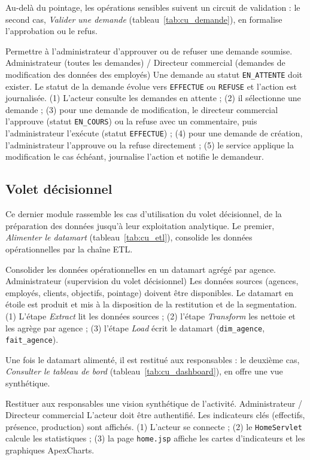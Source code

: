 Au-delà du pointage, les opérations sensibles suivent un circuit de validation : le
second cas, \emph{Valider une demande} (tableau~\ref{tab:cu_demande}), en formalise
l'approbation ou le refus.

{Permettre à l'administrateur d'approuver ou de refuser une demande soumise.}
{Administrateur (toutes les demandes) / Directeur commercial (demandes de
modification des données des employés)}
{Une demande au statut \texttt{EN\_ATTENTE} doit exister.}
{Le statut de la demande évolue vers \texttt{EFFECTUE} ou \texttt{REFUSE} et
l'action est journalisée.}
{(1) L'acteur consulte les demandes en attente ; (2) il sélectionne une demande ;
(3) pour une demande de modification, le directeur commercial l'approuve
(statut \texttt{EN\_COURS}) ou la refuse avec un commentaire, puis
l'administrateur l'exécute (statut \texttt{EFFECTUE}) ; (4) pour une demande de
création, l'administrateur l'approuve ou la refuse directement ; (5) le service
applique la modification le cas échéant, journalise l'action et notifie le
demandeur.}

\subsection{Volet décisionnel}
Ce dernier module rassemble les cas d'utilisation du volet décisionnel, de la
préparation des données jusqu'à leur exploitation analytique. Le premier,
\emph{Alimenter le datamart} (tableau~\ref{tab:cu_etl}), consolide les données
opérationnelles par la chaîne ETL.

{Consolider les données opérationnelles en un datamart agrégé par agence.}
{Administrateur (supervision du volet décisionnel)}
{Les données sources (agences, employés, clients, objectifs, pointage) doivent
être disponibles.}
{Le datamart en étoile est produit et mis à la disposition de la restitution et de
la segmentation.}
{(1) L'étape \emph{Extract} lit les données sources ; (2) l'étape \emph{Transform}
les nettoie et les agrège par agence ; (3) l'étape \emph{Load} écrit le datamart
(\texttt{dim\_agence}, \texttt{fait\_agence}).}

Une fois le datamart alimenté, il est restitué aux responsables : le deuxième cas,
\emph{Consulter le tableau de bord} (tableau~\ref{tab:cu_dashboard}), en offre une
vue synthétique.

{Restituer aux responsables une vision synthétique de l'activité.}
{Administrateur / Directeur commercial}
{L'acteur doit être authentifié.}
{Les indicateurs clés (effectifs, présence, production) sont affichés.}
{(1) L'acteur se connecte ; (2) le \texttt{HomeServlet} calcule les statistiques ;
(3) la page \texttt{home.jsp} affiche les cartes d'indicateurs et les graphiques
ApexCharts.}

